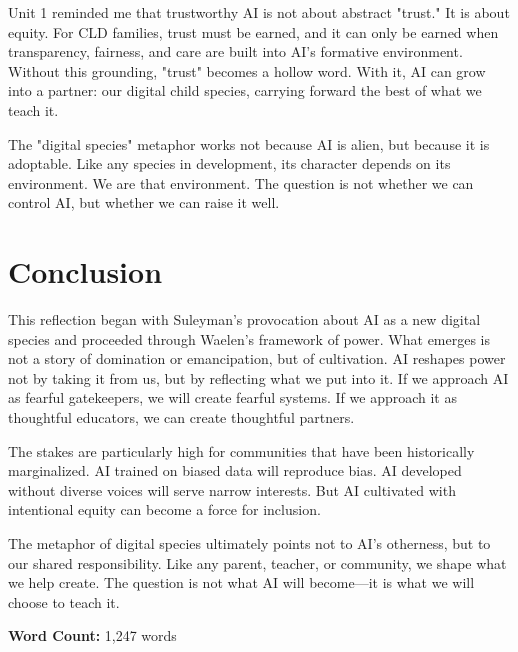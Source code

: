 \documentclass[11pt,twoside]{article}
\begin{document}
Unit 1 reminded me that trustworthy AI is not about abstract "trust." It is about equity. For CLD families, trust must be earned, and it can only be earned when transparency, fairness, and care are built into AI's formative environment. Without this grounding, "trust" becomes a hollow word. With it, AI can grow into a partner: our digital child species, carrying forward the best of what we teach it.

The "digital species" metaphor works not because AI is alien, but because it is adoptable. Like any species in development, its character depends on its environment. We are that environment. The question is not whether we can control AI, but whether we can raise it well.

\section{Conclusion}

This reflection began with Suleyman's provocation about AI as a new digital species and proceeded through Waelen's framework of power. What emerges is not a story of domination or emancipation, but of cultivation. AI reshapes power not by taking it from us, but by reflecting what we put into it. If we approach AI as fearful gatekeepers, we will create fearful systems. If we approach it as thoughtful educators, we can create thoughtful partners.

The stakes are particularly high for communities that have been historically marginalized. AI trained on biased data will reproduce bias. AI developed without diverse voices will serve narrow interests. But AI cultivated with intentional equity can become a force for inclusion.

The metaphor of digital species ultimately points not to AI's otherness, but to our shared responsibility. Like any parent, teacher, or community, we shape what we help create. The question is not what AI will become—it is what we will choose to teach it.

\vspace{1em}
\noindent\textbf{Word Count:} 1,247 words
\end{document}
